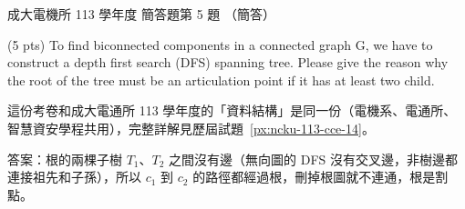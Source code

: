 \begin{pastexam}[label={px:ncku-113-ee-14}]{成大電機所 113 學年度 簡答題第 5 題}
（簡答）

(5 pts) To find biconnected components in a connected graph G, we have to construct a depth
first search (DFS) spanning tree. Please give the reason why the root of the tree must be an
articulation point if it has at least two child.
\end{pastexam}

\begin{pastsoln}
這份考卷和成大電通所 113 學年度的「資料結構」是同一份（電機系、電通所、智慧資安學程共用），完整詳解見歷屆試題~\ref{px:ncku-113-cce-14}。

答案：根的兩棵子樹 $T_1$、$T_2$ 之間沒有邊（無向圖的 DFS 沒有交叉邊，非樹邊都連接祖先和子孫），所以 $c_1$ 到 $c_2$ 的路徑都經過根，刪掉根圖就不連通，根是割點。
\end{pastsoln}
